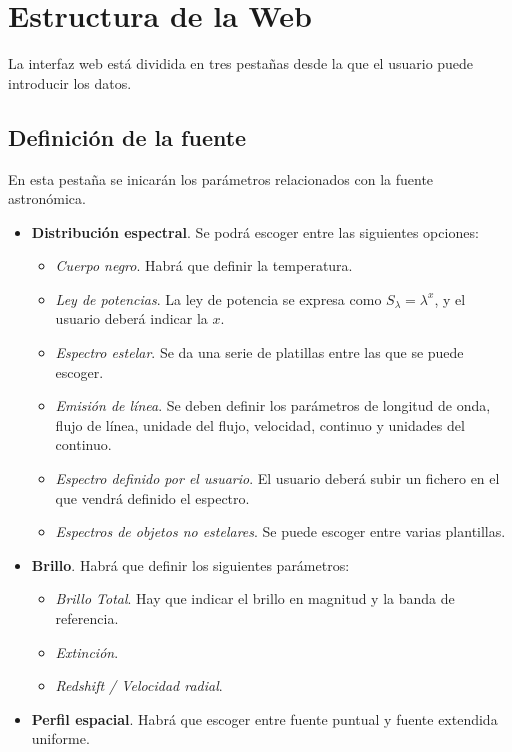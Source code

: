 \section{Estructura de la Web}
La interfaz web est\'a dividida en tres pesta\~nas desde la que el usuario puede introducir los datos.
\subsection{Definici\'on de la fuente}
En esta pesta\~na se inicar\'an los par\'ametros relacionados con la fuente astron\'omica.
\begin{itemize}
    \item \textbf{Distribuci\'on espectral}. Se podr\'a escoger entre las siguientes opciones:
        \begin{itemize}
            \item \textit{Cuerpo negro}. Habr\'a que definir la temperatura.
            \item \textit{Ley de potencias}. La ley de potencia se expresa como $S_\lambda = \lambda^x$, y el usuario deber\'a indicar la $x$.
            \item \textit{Espectro estelar}. Se da una serie de platillas entre las que se puede escoger.
            \item \textit{Emisi\'on de l\'inea}. Se deben definir los par\'ametros de longitud de onda, flujo de l\'inea, unidade del flujo, velocidad, continuo y unidades del continuo.
            \item \textit{Espectro definido por el usuario}. El usuario deber\'a subir un fichero en el que vendr\'a definido el espectro.
            \item \textit{Espectros de objetos no estelares}. Se puede escoger entre varias plantillas.
        \end{itemize}
   \item \textbf{Brillo}. Habr\'a que definir los siguientes par\'ametros:
        \begin{itemize}
            \item \textit{Brillo Total}. Hay que indicar el brillo en magnitud y la banda de referencia.
            \item \textit{Extinci\'on}. 
            \item \textit{Redshift / Velocidad radial}. 
        \end{itemize}
   \item \textbf{Perfil espacial}. Habr\'a que escoger entre fuente puntual y fuente extendida uniforme.
\end{itemize}

